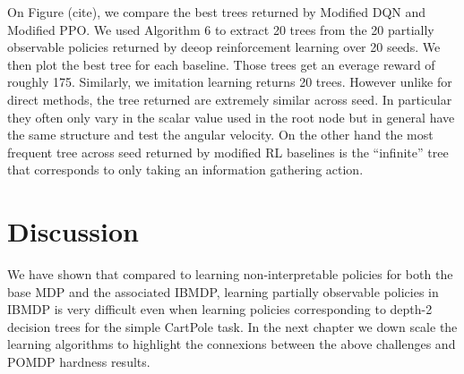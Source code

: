 On Figure (cite), we compare the best trees returned by Modified DQN and Modified PPO. We used Algorithm 6 to extract 20 trees from the 20 partially observable policies returned by deeop reinforcement learning over 20 seeds. We then plot the best tree for each baseline. Those trees get an everage reward of roughly 175.
Similarly, we imitation learning returns 20 trees. However unlike for direct methods, the tree returned are extremely similar across seed. In particular they often only vary in the scalar value used in the root node but in general have the same structure and test the angular velocity.
On the other hand the most frequent tree across seed returned by modified RL baselines is the ``infinite'' tree that corresponds to only taking an information gathering action.


\section{Discussion}
We have shown that compared to learning non-interpretable policies for both the base MDP and the associated IBMDP, learning partially observable policies in IBMDP is very difficult even when learning policies corresponding to depth-2 decision trees for the simple CartPole task.
In the next chapter we down scale the learning algorithms to highlight the connexions between the above challenges and POMDP hardness results.